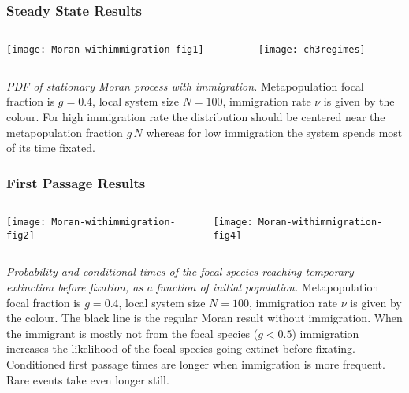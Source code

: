 \documentclass{beamer}
\begin{document}
\begin{frame}
\frametitle{Steady State Results}
\begin{columns}
	\begin{column}{6cm}
		\begin{center}
			\texttt{[image: Moran-withimmigration-fig1]}
		\end{center}
	\end{column}
	\begin{column}{5cm}
		\begin{center}
			\texttt{[image: ch3regimes]}
		\end{center}
	\end{column}
\end{columns}
\justifying
\footnotesize{
\emph{PDF of stationary Moran process with immigration.} 
Metapopulation focal fraction is $g=0.4$, local system size $N=100$, immigration rate $\nu$ is given by the colour. 
For high immigration rate the distribution should be centered near the metapopulation fraction $g\,N$ whereas for low immigration the system spends most of its time fixated. 
}
\end{frame}


\begin{frame}
\frametitle{First Passage Results}
\begin{columns}
	\begin{column}{5.5cm}
		\begin{center}
			\texttt{[image: Moran-withimmigration-fig2]}
		\end{center}
	\end{column}
	\begin{column}{5.5cm}
		\begin{center}
			\texttt{[image: Moran-withimmigration-fig4]}
		\end{center}
	\end{column}
\end{columns}
\justifying
\footnotesize{
	\emph{Probability and conditional times of the focal species reaching temporary extinction before fixation, as a function of initial population.}
	Metapopulation focal fraction is $g=0.4$, local system size $N=100$, immigration rate $\nu$ is given by the colour. 
	The black line is the regular Moran result without immigration. 
	When the immigrant is mostly not from the focal species ($g<0.5$) immigration increases the likelihood of the focal species going extinct before fixating. 
	Conditioned first passage times are longer when immigration is more frequent. 
	Rare events take even longer still. 
}
\end{frame}
\end{document}
